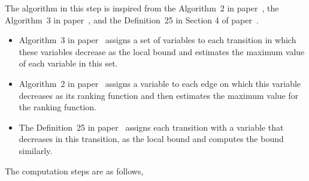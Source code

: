 The algorithm in this step is inspired from the Algorithm~2 in paper~\cite{SinnZV14},
the Algorithm~3 in paper~\cite{ZulegerGSV11},
and the Definition~25 in Section 4 of paper~\cite{SinnZV17}.
\begin{itemize}
\item Algorithm~3 in paper~\cite{ZulegerGSV11} assigns a set of variables to each transition in which these variables decrease as the local bound
and estimates the maximum value of each variable in this set.
\item Algorithm~2 in paper~\cite{SinnZV14} assigns a variable to each edge on which this variable decreases as its ranking function
and then estimates the maximum value for the ranking function.
\item The Definition~25 in paper~\cite{SinnZV17}
assigns each transition with a variable that decreases in this transition, as the local bound and computes the bound similarly.
\end{itemize}
%
The computation steps are as follows,
